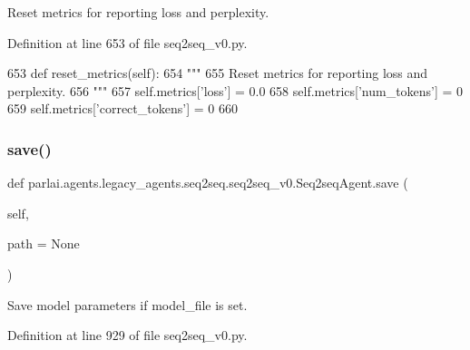 \begin{DoxyVerb}Reset metrics for reporting loss and perplexity.
\end{DoxyVerb}
 

Definition at line 653 of file seq2seq\+\_\+v0.\+py.


\begin{DoxyCode}
653     \textcolor{keyword}{def }reset\_metrics(self):
654         \textcolor{stringliteral}{"""}
655 \textcolor{stringliteral}{        Reset metrics for reporting loss and perplexity.}
656 \textcolor{stringliteral}{        """}
657         self.metrics[\textcolor{stringliteral}{'loss'}] = 0.0
658         self.metrics[\textcolor{stringliteral}{'num\_tokens'}] = 0
659         self.metrics[\textcolor{stringliteral}{'correct\_tokens'}] = 0
660 
\end{DoxyCode}
\mbox{\label{classparlai_1_1agents_1_1legacy__agents_1_1seq2seq_1_1seq2seq__v0_1_1Seq2seqAgent_a31c017cd07b01834a5d467fadfddd7cd}} 
\subsubsection{\texorpdfstring{save()}{save()}}
{\footnotesize\ttfamily def parlai.\+agents.\+legacy\+\_\+agents.\+seq2seq.\+seq2seq\+\_\+v0.\+Seq2seq\+Agent.\+save (\begin{DoxyParamCaption}\item[{}]{self,  }\item[{}]{path = {\ttfamily None} }\end{DoxyParamCaption})}

\begin{DoxyVerb}Save model parameters if model_file is set.
\end{DoxyVerb}
 

Definition at line 929 of file seq2seq\+\_\+v0.\+py.


